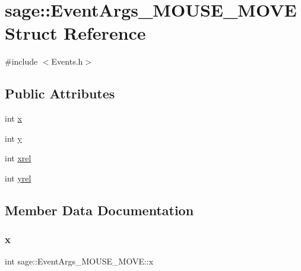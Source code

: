 \hypertarget{structsage_1_1EventArgs__MOUSE__MOVE}{}\section{sage\+::Event\+Args\+\_\+\+M\+O\+U\+S\+E\+\_\+\+M\+O\+VE Struct Reference}
\label{structsage_1_1EventArgs__MOUSE__MOVE}


{\ttfamily \#include $<$Events.\+h$>$}

\subsection*{Public Attributes}
\begin{DoxyCompactItemize}
\item 
int \mbox{\hyperlink{structsage_1_1EventArgs__MOUSE__MOVE_a83c4f35e2a7446cbfaa205d110364e3c}{x}}
\item 
int \mbox{\hyperlink{structsage_1_1EventArgs__MOUSE__MOVE_abea482fa146b91765db17e67a3825a20}{y}}
\item 
int \mbox{\hyperlink{structsage_1_1EventArgs__MOUSE__MOVE_a09f5aa5d859ee3ede24f47175ddba437}{xrel}}
\item 
int \mbox{\hyperlink{structsage_1_1EventArgs__MOUSE__MOVE_ae9d149bdf92eef7a79114298b3d5c91b}{yrel}}
\end{DoxyCompactItemize}


\subsection{Member Data Documentation}
\mbox{\label{structsage_1_1EventArgs__MOUSE__MOVE_a83c4f35e2a7446cbfaa205d110364e3c}} 
\subsubsection{\texorpdfstring{x}{x}}
{\footnotesize\ttfamily int sage\+::\+Event\+Args\+\_\+\+M\+O\+U\+S\+E\+\_\+\+M\+O\+V\+E\+::x}

\mbox{\label{structsage_1_1EventArgs__MOUSE__MOVE_a09f5aa5d859ee3ede24f47175ddba437}} 
